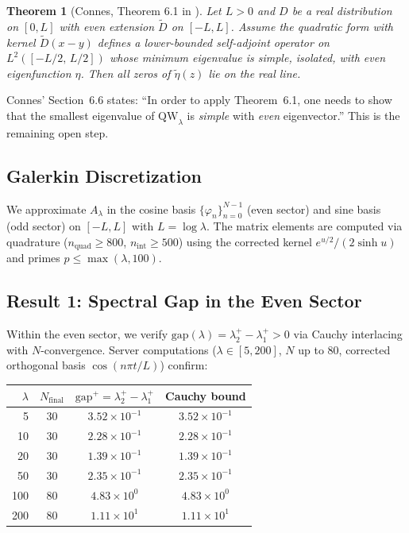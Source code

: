 \documentclass[12pt,a4paper]{article}
\newtheorem{theorem}{Theorem}[section]
\theoremstyle{definition}
\theoremstyle{remark}
\begin{document}
\begin{theorem}[Connes, Theorem 6.1 in \cite{Connes2025}]
Let $L > 0$ and $D$ be a real distribution on $[0,L]$ with even extension $\tilde{D}$ on $[-L,L]$. Assume the quadratic form with kernel $\tilde{D}(x-y)$ defines a lower-bounded self-adjoint operator on $L^2([-L/2,\,L/2])$ whose minimum eigenvalue is simple, isolated, with even eigenfunction $\eta$. Then all zeros of $\tilde{\eta}(z)$ lie on the real line.
\end{theorem}

\noindent Connes' Section~6.6 states: ``In order to apply Theorem~6.1, one needs to show that the smallest eigenvalue of $\mathrm{QW}_\lambda$ is \emph{simple} with \emph{even} eigenvector.'' This is the remaining open step.

\subsection{Galerkin Discretization}

We approximate $A_\lambda$ in the cosine basis $\{\varphi_n\}_{n=0}^{N-1}$ (even sector) and sine basis (odd sector) on $[-L,L]$ with $L = \log\lambda$. The matrix elements are computed via quadrature ($n_{\mathrm{quad}} \geq 800$, $n_{\mathrm{int}} \geq 500$) using the corrected kernel $e^{u/2}/(2\sinh u)$ and primes $p \leq \max(\lambda, 100)$.

\subsection{Result 1: Spectral Gap in the Even Sector}

Within the even sector, we verify $\mathrm{gap}(\lambda) = \lambda_2^+ - \lambda_1^+ > 0$ via Cauchy interlacing with $N$-convergence. Server computations ($\lambda \in [5,200]$, $N$ up to 80, corrected orthogonal basis $\cos(n\pi t/L)$) confirm:

\medskip
\begin{center}
\renewcommand{\arraystretch}{1.2}
\begin{tabular}{r|c|c|c}
$\lambda$ & $N_{\mathrm{final}}$ & $\mathrm{gap}^+ = \lambda_2^+ - \lambda_1^+$ & Cauchy bound \\\hline
5 & 30 & $3.52\times 10^{-1}$ & $3.52\times 10^{-1}$ \\
10 & 30 & $2.28\times 10^{-1}$ & $2.28\times 10^{-1}$ \\
20 & 30 & $1.39\times 10^{-1}$ & $1.39\times 10^{-1}$ \\
50 & 30 & $2.35\times 10^{-1}$ & $2.35\times 10^{-1}$ \\
100 & 80 & $4.83\times 10^{0}$ & $4.83\times 10^{0}$ \\
200 & 80 & $1.11\times 10^{1}$ & $1.11\times 10^{1}$ \\
\end{tabular}
\end{center}
\end{document}
